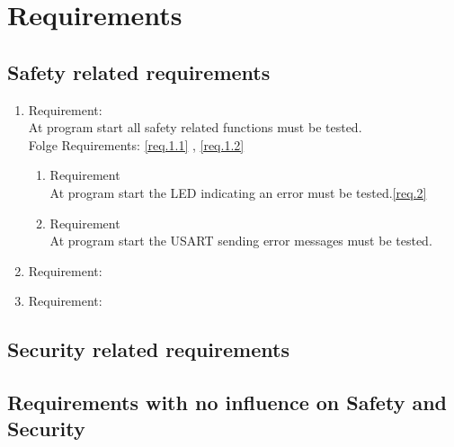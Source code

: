 \section{Requirements}
\label{chapter4}


\subsection{Safety related requirements}




	\begin{enumerate}[label*=\arabic*.]
		\item \label{req.1}  Requirement: \\
		At program start all safety related functions must be tested.  \\
		Folge Requirements: \ref{req.1.1} , \ref{req.1.2}  
		\begin{enumerate}[label*=\arabic*.]
			\item \label{req.1.1}  Requirement  \\
			At program start the LED indicating an error must be tested.\ref{req.2}\\ 
			\item \label{req.1.2} Requirement   \\
			At program start the USART sending error messages must be tested.\\ 
		\end{enumerate}
		\item \label{req.2} Requirement:   \\
		\item \label{req.3} Requirement:   
	\end{enumerate}

\subsection{Security related requirements}


\subsection{Requirements with no influence on Safety and Security}